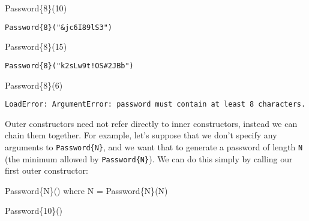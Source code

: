 \documentclass[
  letterpaper,
  DIV=11,
  numbers=noendperiod]{scrreprt}
\newenvironment{Shaded}{\begin{snugshade}}{\end{snugshade}}
\newcommand{\DataTypeTok}[1]{\textcolor[rgb]{0.68,0.00,0.00}{#1}}
\newcommand{\FloatTok}[1]{\textcolor[rgb]{0.68,0.00,0.00}{#1}}
\newcommand{\FunctionTok}[1]{\textcolor[rgb]{0.28,0.35,0.67}{#1}}
\newcommand{\KeywordTok}[1]{\textcolor[rgb]{0.00,0.23,0.31}{#1}}
\newcommand{\NormalTok}[1]{\textcolor[rgb]{0.00,0.23,0.31}{#1}}
\newcommand{\OperatorTok}[1]{\textcolor[rgb]{0.37,0.37,0.37}{#1}}
\begin{document}
\begin{Shaded}
\begin{Highlighting}[]
\FunctionTok{Password}\DataTypeTok{\{8\}}\NormalTok{(}\FloatTok{10}\NormalTok{)}
\end{Highlighting}
\end{Shaded}

\begin{verbatim}
Password{8}("&jc6I89lS3")
\end{verbatim}

\begin{Shaded}
\begin{Highlighting}[]
\FunctionTok{Password}\DataTypeTok{\{8\}}\NormalTok{(}\FloatTok{15}\NormalTok{)}
\end{Highlighting}
\end{Shaded}

\begin{verbatim}
Password{8}("k2sLw9t!OS#2JBb")
\end{verbatim}

\begin{Shaded}
\begin{Highlighting}[]
\FunctionTok{Password}\DataTypeTok{\{8\}}\NormalTok{(}\FloatTok{6}\NormalTok{)}
\end{Highlighting}
\end{Shaded}

\begin{verbatim}
LoadError: ArgumentError: password must contain at least 8 characters.
\end{verbatim}

Outer constructors need not refer directly to inner constructors,
instead we can chain them together. For example, let's suppose that we
don't specify any arguments to \texttt{Password\{N\}}, and we want that
to generate a password of length \texttt{N} (the minimum allowed by
\texttt{Password\{N\}}). We can do this simply by calling our first
outer constructor:

\begin{Shaded}
\begin{Highlighting}[]
\FunctionTok{Password}\DataTypeTok{\{N\}}\NormalTok{() }\KeywordTok{where}\NormalTok{ N }\OperatorTok{=} \FunctionTok{Password}\DataTypeTok{\{N\}}\NormalTok{(N)}
\end{Highlighting}
\end{Shaded}

\begin{Shaded}
\begin{Highlighting}[]
\FunctionTok{Password}\DataTypeTok{\{10\}}\NormalTok{()}
\end{Highlighting}
\end{Shaded}
\end{document}
